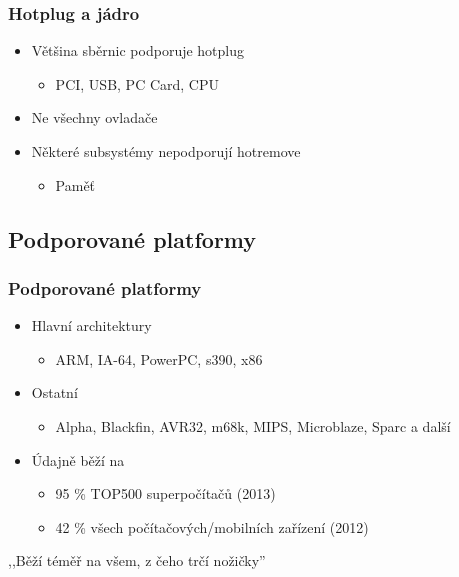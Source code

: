 \documentclass[xcolor=dvipsnames,handout]{beamer}
\begin{document}
\begin{frame}
  \frametitle{Hotplug a jádro}

  \begin{itemize}
    \item Většina sběrnic podporuje hotplug
    \begin{itemize}
      \item PCI, USB, PC Card, CPU
    \end{itemize}
    \item Ne všechny ovladače

    \item Některé subsystémy nepodporují hotremove
    \begin{itemize}
      \item Paměť
    \end{itemize}
  \end{itemize}

\end{frame}


\subsection{Podporované platformy}

\begin{frame}
  \frametitle{Podporované platformy}

  \begin{itemize}
    \item Hlavní architektury
    \begin{itemize}
      \item ARM, IA-64, PowerPC, s390, x86
    \end{itemize}

    \pause

    \item Ostatní
    \begin{itemize}
      \item Alpha, Blackfin, AVR32, m68k, MIPS, Microblaze, Sparc a další
    \end{itemize}

    \pause

    \item Údajně běží na
    \begin{itemize}
      \item 95 \% TOP500 superpočítačů (2013)
      \item 42 \% všech počítačových/mobilních zařízení (2012)
    \end{itemize}
  \end{itemize}

  \pause
  \bigskip

  ,,Běží téměř na všem, z čeho trčí nožičky''

\end{frame}
\end{document}
